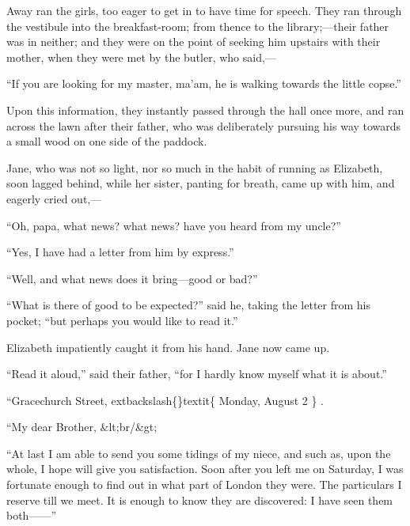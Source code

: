 \documentclass[10pt]{book}
\begin{document}
   Away ran the girls, too eager to get in to have time for speech. They
ran through the vestibule into the breakfast-room; from thence to the
library;—their father was in neither; and they were on the point of
seeking him upstairs with their mother, when they were met by the
butler, who said,—
  

   “If you are looking for my master, ma’am, he is walking towards the
little copse.”
  

   Upon this information, they instantly passed through the hall once more,
and ran across the lawn after their father, who was deliberately
pursuing his way towards a small wood on one side of the paddock.
  

   Jane, who was not so light, nor so much in the habit of running as
Elizabeth, soon lagged behind, while her sister, panting for breath,
came up with him, and eagerly cried out,—
  

   “Oh, papa, what news? what news? have you heard from my uncle?”
  

   “Yes, I have had a letter from him by express.”
  

   “Well, and what news does it bring—good or bad?”
  

   “What is there of good to be expected?” said he, taking the letter from
his pocket; “but perhaps you would like to read it.”
  

   Elizabeth impatiently caught it from his hand. Jane now came up.
  

   “Read it aloud,” said their father, “for I hardly know myself what it is
about.”
  

    “Gracechurch Street,
    	extbackslash\{\}textit\{
     Monday, August 2
    \}
    .
   

    “My dear Brother,
    &lt;br/&gt;

    “At last I am able to send you some tidings of my niece, and such
as, upon the whole, I hope will give
    you satisfaction. Soon after
you left me on Saturday, I was fortunate enough to find out in what
part of London they were. The particulars I reserve till we meet.
It is enough to know they are discovered: I have seen them
both——”
   
\end{document}
